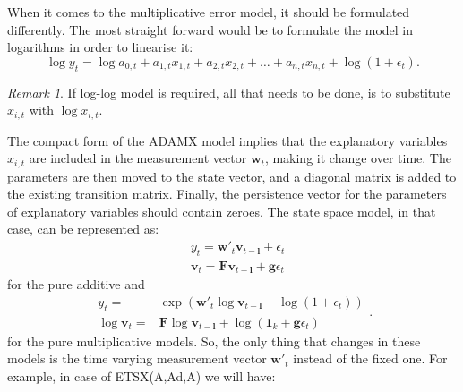 \documentclass[]{book}
\theoremstyle{definition}
\theoremstyle{definition}
\theoremstyle{definition}
\theoremstyle{definition}
\theoremstyle{remark}
\newtheorem*{remark}{Remark}
\begin{document}
When it comes to the multiplicative error model, it should be formulated differently. The most straight forward would be to formulate the model in logarithms in order to linearise it:
\begin{equation}
  \log {y}_{t} = \log a_{0,t} + a_{1,t} x_{1,t} + a_{2,t} x_{2,t} + \dots + a_{n,t} x_{n,t} + \log(1+ \epsilon_t).
  \label{eq:ETSXADAMStateSpacePureMultiplicativeMeasurement}
\end{equation}

\begin{remark}
If log-log model is required, all that needs to be done, is to substitute \(x_{i,t}\) with \(\log x_{i,t}\).
\end{remark}

The compact form of the ADAMX model implies that the explanatory variables \(x_{i,t}\) are included in the measurement vector \(\mathbf{w}_{t}\), making it change over time. The parameters are then moved to the state vector, and a diagonal matrix is added to the existing transition matrix. Finally, the persistence vector for the parameters of explanatory variables should contain zeroes. The state space model, in that case, can be represented as:
\begin{equation}
  \begin{aligned}
    & {y}_{t} = \mathbf{w}'_t \mathbf{v}_{t-\mathbf{l}} + \epsilon_t \\
    & \mathbf{v}_t = \mathbf{F} \mathbf{v}_{t-\mathbf{l}} + \mathbf{g} \epsilon_t
  \end{aligned}
  \label{eq:ETSXADAMStateSpacePureAdditiveFull}
\end{equation}
for the pure additive and
\begin{equation}
  \begin{aligned}
    {y}_{t} = & \exp\left(\mathbf{w}'_t \log \mathbf{v}_{t-\mathbf{l}} + \log(1 + \epsilon_t)\right) \\
    \log \mathbf{v}_t = & \mathbf{F} \log \mathbf{v}_{t-\mathbf{l}} + \log(\mathbf{1}_k + \mathbf{g} \epsilon_t)
  \end{aligned}. 
  \label{eq:ETSXADAMStateSpacePureMultiplicativeFull}
\end{equation}
for the pure multiplicative models. So, the only thing that changes in these models is the time varying measurement vector \(\mathbf{w}'_t\) instead of the fixed one. For example, in case of ETSX(A,Ad,A) we will have:
\end{document}
